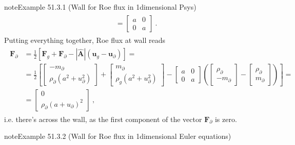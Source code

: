 \documentclass[letterpaper,10pt,english]{jupyterBook}
\begin{document}
\begin{sphinxadmonition}{note}{Example 51.3.1 (Wall for Roe flux in 1\sphinxhyphen{}dimensional P\sphinxhyphen{}sys)}
\begin{equation*}
\begin{split}
\begin{aligned}
& = \begin{bmatrix} a & 0 \\ 0 & a \end{bmatrix} \ . 
\end{aligned}\end{split}
\end{equation*}
\sphinxAtStartPar
{} Putting everything together, Roe flux at wall reads
\begin{equation*}
\begin{split}\begin{aligned}
  \mathbf{F}_{\partial} 
  & = \frac{1}{2} \left[ \mathbf{F}_{g} + \mathbf{F}_{\partial} - \left| \hat{\mathbf{A}} \right| \left( \mathbf{u}_{g} - \mathbf{u}_{\partial} \right) \right] = \\
  & = \frac{1}{2} \left[ \begin{bmatrix} -m_\partial \\ \rho_\partial \left( a^2 + u^2_\partial \right)  \end{bmatrix} + \begin{bmatrix} m_\partial \\ \rho_g \left( a^2 + u^2_\partial \right) \end{bmatrix} - \begin{bmatrix} a & 0 \\ 0 & a \end{bmatrix} \left( \begin{bmatrix} \rho_\partial \\ -m_\partial \end{bmatrix} - \begin{bmatrix} \rho_\partial \\ m_\partial \end{bmatrix} \right) \right] = \\
  & = \begin{bmatrix} 0 \\ \rho_\partial ( a + u_\partial )^2 \end{bmatrix} \ ,
\end{aligned}\end{split}
\end{equation*}
\sphinxAtStartPar
i.e. there’s  across the wall, as the first component of the vector \(\mathbf{F}_\partial\) is zero.
\end{sphinxadmonition}
\label{ch/pde/fvm-hyperbolic-bc:example-1}
\begin{sphinxadmonition}{note}{Example 51.3.2 (Wall for Roe flux in 1\sphinxhyphen{}dimensional Euler equations)}


\end{sphinxadmonition}
\end{document}
